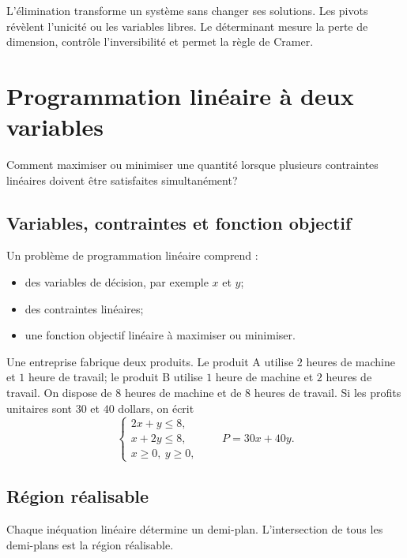 \documentclass[12pt,a4paper,openany]{book}
\begin{document}
\begin{summarybox}
L'élimination transforme un système sans changer ses solutions. Les pivots révèlent l'unicité ou les variables libres. Le déterminant mesure la perte de dimension, contrôle l'inversibilité et permet la règle de Cramer.
\end{summarybox}


\chapter{Programmation linéaire à deux variables}

\begin{questionbox}
Comment maximiser ou minimiser une quantité lorsque plusieurs contraintes linéaires doivent être satisfaites simultanément?
\end{questionbox}

\section{Variables, contraintes et fonction objectif}

Un problème de programmation linéaire comprend :
\begin{itemize}
\item des variables de décision, par exemple $x$ et $y$;
\item des contraintes linéaires;
\item une fonction objectif linéaire à maximiser ou minimiser.
\end{itemize}

\begin{examplebox}
Une entreprise fabrique deux produits. Le produit A utilise $2$ heures de machine et $1$ heure de travail; le produit B utilise $1$ heure de machine et $2$ heures de travail. On dispose de $8$ heures de machine et de $8$ heures de travail. Si les profits unitaires sont $30$ et $40$ dollars, on écrit
\[
\begin{cases}
2x+y\le8,\\
x+2y\le8,\\
x\ge0,\ y\ge0,
\end{cases}
\qquad
P=30x+40y.
\]
\end{examplebox}

\section{Région réalisable}

Chaque inéquation linéaire détermine un demi-plan. L'intersection de tous les demi-plans est la région réalisable.
\end{document}
